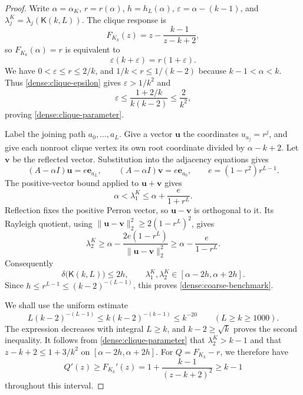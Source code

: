 \documentclass[11pt,a4paper]{article}
\numberwithin{equation}{section}
\theoremstyle{definition}
\theoremstyle{remark}
\newcommand{\Kite}{\mathsf{K}}
\begin{document}
\begin{proof}
Write $\alpha=\alpha_K$, $r=r(\alpha)$, $h=h_L(\alpha)$,
$\varepsilon=\alpha-(k-1)$, and
$\lambda_j^K=\lambda_j(\Kite(k,L))$.
The clique response is
\[
 F_{K_k}(z)=z-\frac{k-1}{z-k+2},
\]
so $F_{K_k}(\alpha)=r$ is equivalent to
\begin{equation}\label{dense:clique-epsilon}
 \varepsilon(k+\varepsilon)=r(1+\varepsilon).
\end{equation}
We have $0<\varepsilon\le r\le2/k$, and
$1/k<r\le1/(k-2)$ because $k-1<\alpha<k$.
Thus \eqref{dense:clique-epsilon} gives
$\varepsilon>1/k^2$ and
\[
 \varepsilon\le\frac{1+2/k}{k(k-2)}\le\frac2{k^2},
\]
proving \eqref{dense:clique-parameter}.

Label the joining path $a_0,\ldots,a_L$.
Give a vector $\mathbf u$ the coordinates $u_{a_j}=r^j$,
and give each nonroot clique vertex its own root coordinate divided
by $\alpha-k+2$.  Let $\mathbf v$ be the reflected vector.
Substitution into the adjacency equations gives
\[
 (A-\alpha I)\mathbf u=e\mathbf e_{a_L},
 \qquad
 (A-\alpha I)\mathbf v=e\mathbf e_{a_0},
 \qquad e=(1-r^2)r^{L-1}.
\]
The positive-vector bound applied to $\mathbf u+\mathbf v$ gives
\[
 \alpha<\lambda_1^K\le\alpha+\frac{e}{1+r^L}.
\]
Reflection fixes the positive Perron vector, so
$\mathbf u-\mathbf v$ is orthogonal to it.  Its Rayleigh quotient,
using $\lVert\mathbf u-\mathbf v\rVert_2^2\ge2(1-r^L)^2$, gives
\[
 \lambda_2^K
 \ge\alpha-\frac{2e(1-r^L)}{\lVert\mathbf u-\mathbf v\rVert_2^2}
 \ge\alpha-\frac{e}{1-r^L}.
\]
Consequently
\[
 \delta\bigl(\Kite(k,L)\bigr)\le2h,
 \qquad
 \lambda_1^K,\lambda_2^K\in[\alpha-2h,\alpha+2h].
\]
Since $h\le r^{L-1}\le(k-2)^{-(L-1)}$, this proves
\eqref{dense:coarse-benchmark}.

We shall use the uniform estimate
\begin{equation}\label{dense:tiny}
 L(k-2)^{-(L-1)}
 \le k(k-2)^{-(k-1)}\le k^{-20}
 \qquad(L\ge k\ge1000).
\end{equation}
The expression decreases with integral $L\ge k$, and
$k-2\ge\sqrt{k}$ proves the second inequality.
It follows from \eqref{dense:clique-parameter} that
$\lambda_2^K>k-1$ and that
$z-k+2\le1+3/k^2$ on $[\alpha-2h,\alpha+2h]$.
For $Q=F_{K_k}-r$, we therefore have
\begin{equation}\label{dense:clique-Q-slope}
 Q'(z)\ge F_{K_k}'(z)
   =1+\frac{k-1}{(z-k+2)^2}\ge k-1
\end{equation}
throughout this interval.


\end{proof}
\end{document}
